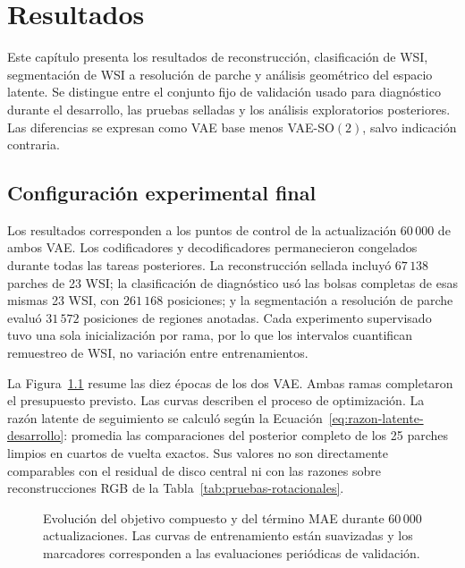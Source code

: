 \chapter{Resultados}

Este capítulo presenta los resultados de
reconstrucción, clasificación de WSI, segmentación de WSI a resolución de
parche y análisis geométrico del espacio latente. Se distingue entre el
conjunto fijo de validación usado para diagnóstico durante el desarrollo, las
pruebas selladas y los análisis exploratorios posteriores. Las diferencias se
expresan como VAE base menos VAE-\(\mathrm{SO}(2)\), salvo indicación contraria.

\section{Configuración experimental final}

Los resultados corresponden a los puntos de control de la actualización
\(60\,000\) de ambos VAE. Los codificadores y decodificadores permanecieron
congelados durante todas las tareas posteriores. La reconstrucción sellada
incluyó \(67\,138\) parches de 23 WSI; la clasificación de diagnóstico usó las
bolsas completas de esas mismas 23 WSI, con \(261\,168\) posiciones; y la
segmentación a resolución de parche evaluó \(31\,572\) posiciones de regiones
anotadas. Cada experimento supervisado tuvo una sola inicialización por rama,
por lo que los intervalos cuantifican remuestreo de WSI, no variación entre
entrenamientos.

La Figura~\ref{fig:entrenamiento-vae} resume las diez épocas de los dos VAE.
Ambas ramas completaron el presupuesto previsto. Las curvas describen el proceso de optimización.
La razón latente de seguimiento se calculó según la
Ecuación~\eqref{eq:razon-latente-desarrollo}: promedia las comparaciones del
posterior completo de los 25 parches limpios en cuartos de vuelta exactos.
Sus valores no son directamente comparables con el residual de disco central
ni con las razones sobre reconstrucciones RGB de la
Tabla~\ref{tab:pruebas-rotacionales}.



\begin{figure}[p]
    \centering
    \caption{Evolución del objetivo compuesto y del término MAE durante
    \(60\,000\) actualizaciones. Las curvas de entrenamiento están suavizadas y
    los marcadores corresponden a las evaluaciones periódicas de validación.}
    \label{fig:entrenamiento-vae}
\end{figure}

